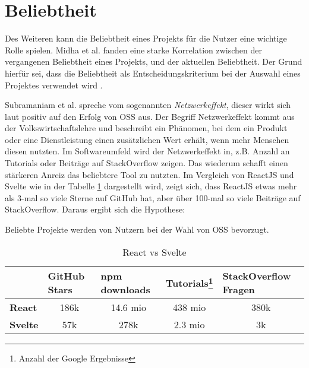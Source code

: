 \section{Beliebtheit}\label{sec:beliebtheit_erfolgsfaktor}

Des Weiteren kann die Beliebtheit eines Projekts für die Nutzer eine wichtige Rolle spielen. 
Midha et al. fanden eine starke Korrelation zwischen der vergangenen Beliebtheit 
eines Projekts, und der aktuellen Beliebtheit. Der Grund hierfür sei, dass die Beliebtheit
als Entscheidungskriterium bei der Auswahl eines Projektes verwendet wird
\cite{midhaFactorsAffectingSuccess2012}. %

Subramaniam et al. spreche vom sogenannten \textit{Netzwerkeffekt},
dieser wirkt sich laut \cite{subramaniamDeterminantsOpenSource2009} %
positiv auf den Erfolg von OSS aus.
Der Begriff Netzwerkeffekt kommt aus der Volkswirtschaftslehre und beschreibt ein Phänomen,
bei dem ein Produkt oder eine Dienstleistung einen zusätzlichen Wert erhält, wenn mehr Menschen
diesen nutzten.
Im Softwareumfeld wird der Netzwerkeffekt in, z.B. Anzahl an Tutorials
oder Beiträge auf StackOverflow zeigen.
Das wiederum schafft einen stärkeren Anreiz das beliebtere Tool zu nutzten.
Im Vergleich von ReactJS und Svelte wie in der Tabelle \ref{tab:react_vs_svelte} dargestellt wird, 
zeigt sich, dass ReactJS etwas mehr als 3-mal so viele Sterne auf GitHub hat, aber über 100-mal so viele 
Beiträge auf StackOverflow. 
Daraus ergibt sich die Hypothese:


\begin{hypothesis}
    Beliebte Projekte werden von Nutzern bei der Wahl von OSS bevorzugt.
    \label{H:8} %
\end{hypothesis}


\begin{table}[h]
    \begin{tabular}{lcccc}
        \hline
                        & \multicolumn{1}{l}{\textbf{GitHub Stars}} & \multicolumn{1}{l}{\textbf{npm downloads}} & \multicolumn{1}{l}{\textbf{Tutorials}\footnote{Anzahl der Google Ergebnisse}} & \multicolumn{1}{l}{\textbf{StackOverflow Fragen}} \\ \hline
        \textbf{React}  & 186k                                      & 14.6 mio                                   & 438 mio                                                                       & 380k                                              \\
        \textbf{Svelte} & 57k                                       & 278k                                       & 2.3 mio                                                                       & 3k
    \end{tabular}%
    \caption{React vs Svelte}
    \label{tab:react_vs_svelte}
\end{table}
